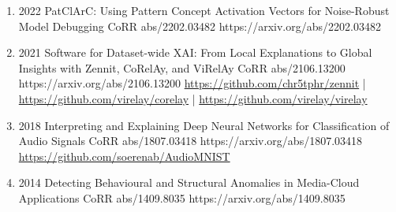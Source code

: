 \documentclass[10pt,a4paper]{article} %
\begin{document}
{\begin{enumerate}
        \item {}
                            {2022}
                            {PatClArC: Using Pattern Concept Activation Vectors for Noise-Robust Model Debugging}
                            {CoRR abs/2202.03482}
                            {https://arxiv.org/abs/2202.03482}

        \item {}
                            {2021}
                            {Software for Dataset-wide XAI: From Local Explanations to Global Insights with Zennit, CoRelAy, and ViRelAy}
                            {CoRR abs/2106.13200}
                            {https://arxiv.org/abs/2106.13200}
                            {   \href{https://github.com/chr5tphr/zennit}{https://github.com/chr5tphr/zennit} | \\
                                \href{https://github.com/virelay/corelay}{https://github.com/virelay/corelay} |
                                \href{https://github.com/virelay/virelay}{https://github.com/virelay/virelay}
                            }

        \item {}
                            {2018}
                            {Interpreting and Explaining Deep Neural Networks for Classification of Audio Signals}
                            {CoRR abs/1807.03418}
                            {https://arxiv.org/abs/1807.03418}
                            {\href{https://github.com/soerenab/AudioMNIST}{https://github.com/soerenab/AudioMNIST}}

        \item {}
                            {2014}
                            {Detecting Behavioural and Structural Anomalies in Media-Cloud Applications}
                            {CoRR abs/1409.8035}
                            {https://arxiv.org/abs/1409.8035}

    \end{enumerate}

}
\end{document}

